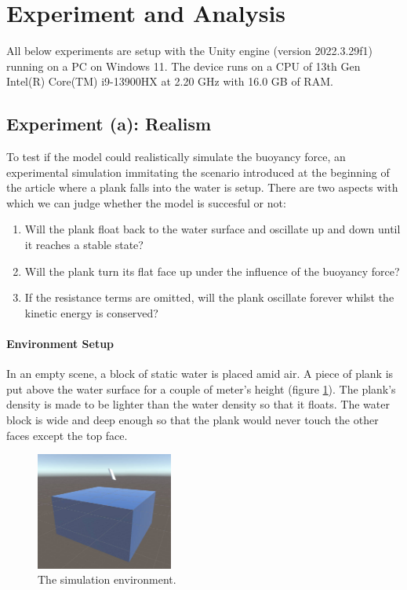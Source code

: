 \section{Experiment and Analysis}

All below experiments are setup with the Unity engine (version 2022.3.29f1) running on a PC on Windows 11.
The device runs on a CPU of 13th Gen Intel(R) Core(TM) i9-13900HX at 2.20 GHz with 16.0 GB of RAM.

\subsection{Experiment (a): Realism}

To test if the model could realistically simulate the buoyancy force, an experimental simulation immitating the scenario introduced at the beginning of the article where a plank falls into the water is setup.
There are two aspects with which we can judge whether the model is succesful or not:
\begin{enumerate}
	\item Will the plank float back to the water surface and oscillate up and down until it reaches a stable state?
	\item Will the plank turn its flat face up under the influence of the buoyancy force?
	\item If the resistance terms are omitted, will the plank oscillate forever whilst the kinetic energy is conserved?
\end{enumerate}

\paragraph*{Environment Setup}

In an empty scene, a block of static water is placed amid air.
A piece of plank is put above the water surface for a couple of meter's height (figure \ref{simulation-environment}).
The plank's density is made to be lighter than the water density so that it floats.
The water block is wide and deep enough so that the plank would never touch the other faces except the top face.

\begin{figure}[h]
	\centering
	\includegraphics[width=0.4\textwidth]{figures/experiment-environment.jpg}
	\caption{The simulation environment.}
	\label{simulation-environment}
\end{figure}

